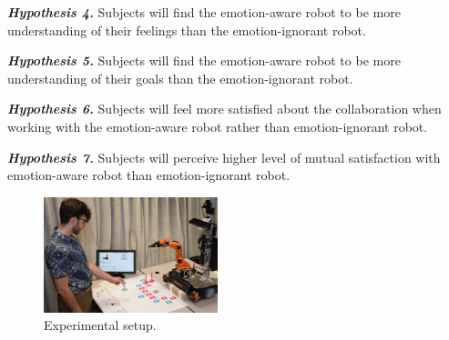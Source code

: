 \documentclass{sig-alternate-05-2015}
\begin{document}
\textit{\textbf{Hypothesis 4.}} Subjects will find the emotion-aware robot to be
more understanding of their feelings than the emotion-ignorant robot.

\textit{\textbf{Hypothesis 5.}} Subjects will find the emotion-aware robot to be
more understanding of their goals than the emotion-ignorant robot.

\textit{\textbf{Hypothesis 6.}} Subjects will feel more satisfied about the
collaboration when working with the emotion-aware robot rather than
emotion-ignorant robot.

\textit{\textbf{Hypothesis 7.}} Subjects will perceive higher level of mutual
satisfaction with emotion-aware robot than emotion-ignorant robot.

\begin{figure}
  \centering
  \includegraphics[width=0.45\textwidth]{figure/environment.png}
  \caption{{\fontsize{9}{9}\selectfont Experimental setup.}}
  \label{fig:environment}
  \vspace*{-5mm}
\end{figure}

\vspace*{3mm}
\end{document}
